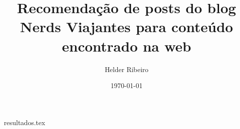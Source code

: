 \documentclass{article}
\title{Recomendação de posts do blog Nerds Viajantes para conteúdo encontrado na web}
\author{Helder Ribeiro}
\date{\today}
\begin{document}

\maketitle

\pagebreak

\tableofcontents{}

{resultados.tex}
\end{document}
